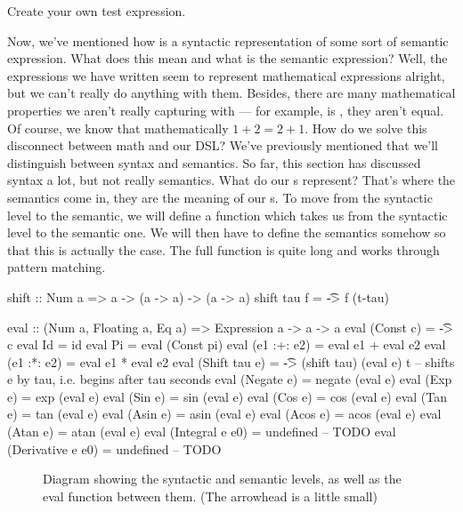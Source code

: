 \begin{exercise}
Create your own test expression.
\end{exercise}
Now, we've mentioned how  is a syntactic
representation of some sort of semantic expression. What does this mean and what
is the semantic expression? Well, the expressions we have written seem to
represent mathematical expressions alright, but we can't really do anything with
them. Besides, there are many mathematical properties we aren't really capturing
with  --- for example,  is , they aren't equal. Of course, we know that
mathematically $1+2=2+1$. How do we solve this disconnect between math and our DSL? 
We've previously mentioned  that we'll distinguish between syntax and
semantics. So far, this section has discussed syntax a lot, but not really semantics. What
do our s represent? That's where the semantics come in, they are
the meaning of our s. To move from the syntactic level to the
semantic, we will define a function  which takes us from the syntactic
level to the semantic one. 
We will then have to define the semantics somehow so that this is actually the case. 
The full function is quite long and works through pattern matching. 
\begin{code}
shift :: Num a => a -> (a -> a) -> (a -> a)
shift tau f = \t -> f (t-tau)

eval :: (Num a, Floating a, Eq a) => Expression a -> a -> a
eval (Const c)           = \t -> c
eval Id                  = id
eval Pi                  = eval (Const pi)
eval (e1 :+: e2)         = eval e1 + eval e2
eval (e1 :*: e2)         = eval e1 * eval e2
eval (Shift tau e)       = \t -> (shift tau) (eval e) t -- shifts e by tau, i.e. begins after tau seconds
eval (Negate e)          = negate (eval e)
eval (Exp e)             = exp    (eval e)
eval (Sin e)             = sin    (eval e)
eval (Cos e)             = cos    (eval e)
eval (Tan e)             = tan    (eval e)
eval (Asin e)            = asin   (eval e)
eval (Acos e)            = acos   (eval e)
eval (Atan e)            = atan   (eval e)
eval (Integral   e e0)   = undefined -- TODO
eval (Derivative e e0)   = undefined -- TODO
\end{code}
\begin{figure}
  \centering
  \caption[Diagram: syntax, eval, semantics]{Diagram showing the syntactic and
    semantic levels, as well as the eval function between them. (The arrowhead
    is a little small)}
  \label{fig:diagram-eval}
\end{figure}
